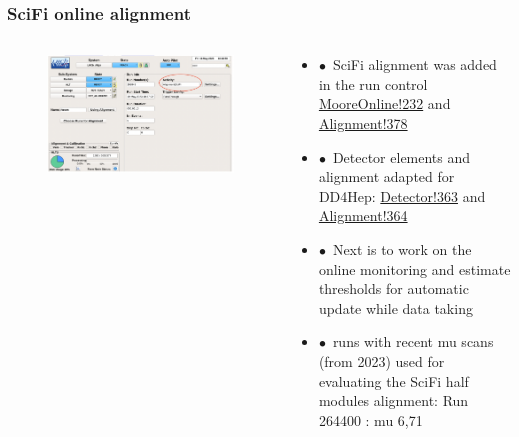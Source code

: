 \documentclass[aspectratio=1610, 12pt, xcolor=dvipsnames]{beamer}
\begin{document}
\begin{frame}\frametitle{SciFi online alignment}
  \begin{columns}
    \begin{column}[c]{0.58\textwidth}
      \begin{figure}
	\includegraphics[width=\textwidth]{plots/align_run_control.png}
      \end{figure}
    \end{column}
    \begin{column}[c]{0.38\textwidth}
      \begin{itemize}
        \item \scriptsize $\bullet$\, SciFi alignment was added in the run control \href{https://gitlab.cern.ch/lhcb/MooreOnline/-/merge_requests/232}{MooreOnline!232} and \href{https://gitlab.cern.ch/lhcb/Alignment/-/merge_requests/378}{Alignment!378}
	      \item $\bullet$\, Detector elements and alignment adapted for DD4Hep: \href{https://gitlab.cern.ch/lhcb/Detector/-/merge_requests/363}{Detector!363} and \href{https://gitlab.cern.ch/lhcb/Alignment/-/merge_requests/364}{Alignment!364}
	      \item $\bullet$\, Next is to work on the online monitoring and estimate thresholds for automatic update while data taking
	      \item $\bullet$\, runs with recent mu scans (from 2023) used for evaluating the SciFi half modules alignment: Run 264400 : mu 6,71
      \end{itemize}
    \end{column}
  \end{columns}
\end{frame}
\end{document}
